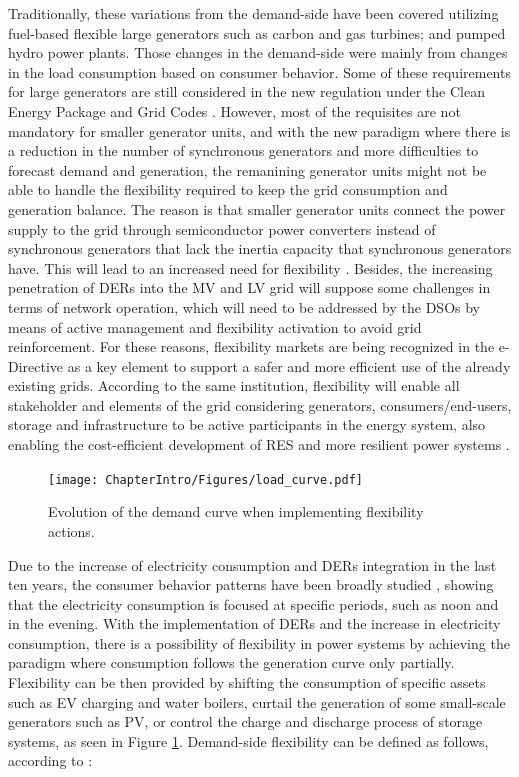 Traditionally, these variations from the demand-side have been covered utilizing fuel-based flexible large generators such as carbon and gas turbines; and pumped hydro power plants. Those changes in the demand-side were mainly from changes in the load consumption based on consumer behavior.
Some of these requirements for large generators are still considered in the new regulation under the Clean Energy Package and Grid Codes \cite{validzic2017clean}. However, most of the requisites are not mandatory for smaller generator units, and with the new paradigm where there is a reduction in the number of synchronous generators and more difficulties to forecast demand and generation, the remanining generator units might not be able to handle the flexibility required to keep the grid consumption and generation balance. The reason is that smaller generator units connect the power supply to the grid through semiconductor power converters instead of synchronous generators that lack the inertia capacity that synchronous generators have. This will lead to an increased need for flexibility \cite{Xu2019}. Besides, the increasing penetration of DERs into the MV and LV grid will suppose some challenges in terms of network operation, which will need to be addressed by the DSOs by means of active management and flexibility activation to avoid grid reinforcement. For these reasons, flexibility markets are being recognized in the e-Directive \cite{Directive2019944} as a key element to support a safer and more efficient use of the already existing grids.
According to the same institution, flexibility will enable all stakeholder and elements of the grid considering generators, consumers/end-users, storage and infrastructure to be active participants in the energy system, also enabling the cost-efficient development of RES and more resilient power systems \cite{Hillberg2019}.  

\begin{figure}[h]
	\centering 
	\texttt{[image: ChapterIntro/Figures/load\_curve.pdf]}
		\caption{Evolution of the demand curve when implementing flexibility actions.}  
		\label{fig:load_shifting}
\end{figure}

Due to the increase of electricity consumption and DERs integration in the last ten years, the consumer behavior patterns have been broadly studied \cite{ZHOU201773,TORRITI2014265}, showing that the electricity consumption is focused at specific periods, such as noon and in the evening. With the implementation of DERs and the increase in electricity consumption, there is a possibility of flexibility in power systems by achieving the paradigm where consumption follows the generation curve only partially. Flexibility can be then provided by shifting the consumption of specific assets such as EV charging and water boilers, curtail the generation of some small-scale generators such as PV, or control the charge and discharge process of storage systems, as seen in Figure \ref{fig:load_shifting}. Demand-side flexibility can be defined as follows, according to \cite{EuropeanSmartGridsTaskForceExpertGroup32019}: 

